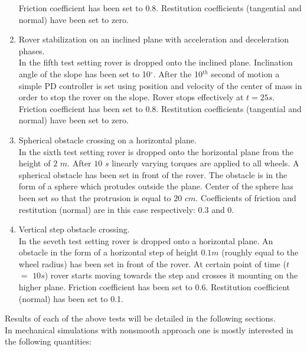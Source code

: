 \documentclass[a4paper]{article}
\begin{document}
\begin{enumerate}
        Friction coefficient has been set to 0.8. Restitution coefficients (tangential and normal) have been set to zero. 

  \item Rover stabilization on an inclined plane with acceleration and deceleration phases.\\[1mm]
        In the fifth test setting rover is dropped onto the inclined plane.
        Inclination angle of the slope has been set to 10$^\circ$. After the 10$^{th}$ second of motion a simple PD controller
        is set using position and velocity of the center of mass in order to stop the rover on the slope. Rover stops effectively at $t = 25s$.
        Friction coefficient has been set to 0.8. Restitution coefficients (tangential and normal) have been set to zero. 

  \item Spherical obstacle crossing on a horizontal plane.\\[1mm] 
        In the sixth test setting rover is dropped onto the horizontal plane from the height of $2$ $m$. After $10$ $s$ linearly varying torques are applied to all wheels. 
        A spherical obstacle has been set in front of the rover. The obstacle is in the form of a sphere which protudes outside the plane.
        Center of the sphere has been set so that the protrusion is equal to $20$ $cm$. Coefficients of friction and restitution (normal) are in this case respectively:
        0.3 and 0. 

  \item Vertical step obstacle crossing.\\[1mm]
        In the seveth test setting rover is dropped onto a horizontal plane.
        An obstacle in the form of a horizontal step of height $0.1m$ (roughly equal to the wheel radius) has been set in front of the rover.
        At certain point of time ($t$ $=$ $10s$) rover starts moving towards the step and crosses it mounting on the higher plane.
        Friction coefficient has been set to 0.6. Restitution coefficient (normal) has been set to 0.1. 

\end{enumerate}

\noindent Results of each of the above tests  will be detailed in the following sections.\\[1mm]
\noindent In mechanical simulations with nonsmooth approach one is mostly interested in the following quantities:
\end{document}
